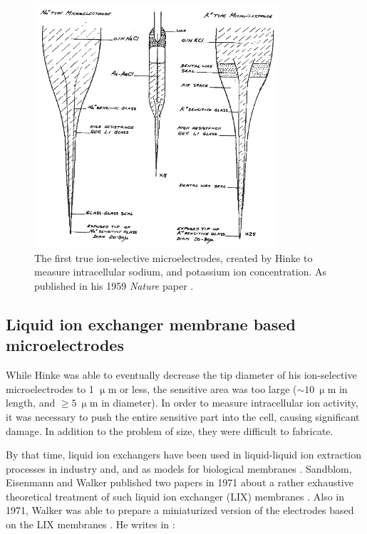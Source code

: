 \begin{figure}
\centering
\includegraphics[height=9cm, keepaspectratio]{img/theory/hinke.jpg}
\caption[The first true ion-selective microelectrodes, created by Hinke.]{The first true ion-selective microelectrodes, created by Hinke to measure intracellular sodium, and potassium ion concentration.
As published in his 1959 \emph{Nature} paper \cite{hinke1959glass}.}
\label{fig:hinke}
\end{figure}

\subsection{Liquid ion exchanger membrane based microelectrodes}
While Hinke was able to eventually decrease the tip diameter of his ion-selective microelectrodes to 1 $\upmu$m or less, the sensitive area was too large ($\sim 10~\upmu$m in length, and $\geq5~\upmu$m in diameter).
In order to measure intracellular ion activity, it was necessary to push the entire sensitive part into the cell, causing significant damage.
In addition to the problem of size, they were difficult to fabricate.

By that time, liquid ion exchangers have been used in liquid-liquid ion extraction processes in industry and, and as models for biological membranes \cite{beutner1913new, eisenman1967membrane}.
Sandblom, Eisenmann and Walker published two papers in 1971 about a rather exhaustive theoretical treatment of such liquid ion exchanger (LIX) membranes \cite{walkerLIX1, walkerLIX2}.
Also in 1971, Walker was able to prepare a miniaturized version of the electrodes based on the LIX membranes \cite{walker1971ion}.
He writes in \cite{walker1971ion}:

